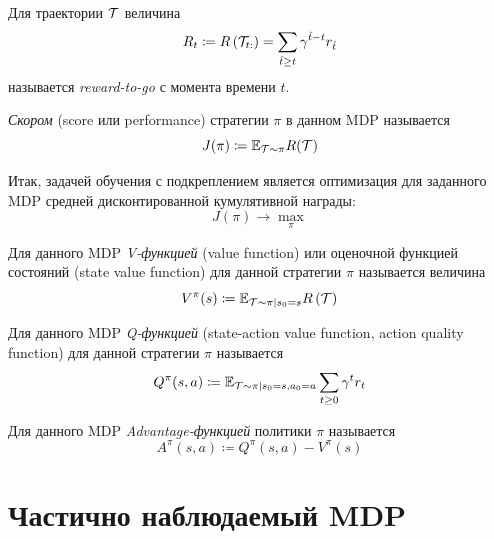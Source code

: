 \documentclass[../main.tex]{subfiles}
\begin{document}
	Для траектории $\mathcal{T}$ величина
	\begin{equation}\label{rewardtogo}
	R_t \coloneqq R \left( \mathcal{T}_{t:} \right) = \sum_{\hat{t} \ge t} \gamma^{\hat{t} - t} r_{\hat{t}}
	\end{equation}
	называется \emph{reward-to-go} с момента времени $t$.


\begin{definition}
	\emph{Скором} (score или performance) стратегии $\pi$ в данном MDP называется
	\begin{equation}\label{goal}
	J(\pi) \coloneqq \mathbb{E}_{\mathcal{T} \sim \pi} R(\mathcal{T})
	\end{equation}
\end{definition}

Итак, задачей обучения с подкреплением является оптимизация для заданного MDP средней дисконтированной кумулятивной награды:
\begin{equation*}
	J(\pi) \to \max_{\pi}
\end{equation*}

\begin{definition} 
	Для данного MDP \emph{V-функцией} (value function) или оценочной функцией состояний (state value function) для данной стратегии $\pi$ называется величина 
	\begin{equation}\label{Vdefinition}
	V^\pi(s) \coloneqq \mathbb{E}_{\mathcal{T} \sim \pi \mid s_0 = s} R \left( \mathcal{T} \right)
	\end{equation}
\end{definition}

\begin{definition} 
	Для данного MDP \emph{Q-функцией} (state-action value function, action quality function) для данной стратегии $\pi$ называется
	$$Q^\pi(s, a) \coloneqq \mathbb{E}_{\mathcal{T} \sim \pi \mid s_0 = s, a_0 = a} \sum_{t \ge 0} \gamma^t r_t$$
\end{definition}

\begin{definition} 
	Для данного MDP \emph{Advantage-функцией} политики $\pi$ называется
	\begin{equation}\label{advantage}
	A^\pi(s, a) \coloneqq Q^\pi(s, a) - V^\pi(s)
	\end{equation}
\end{definition}



\section{Частично наблюдаемый MDP}
\end{document}
